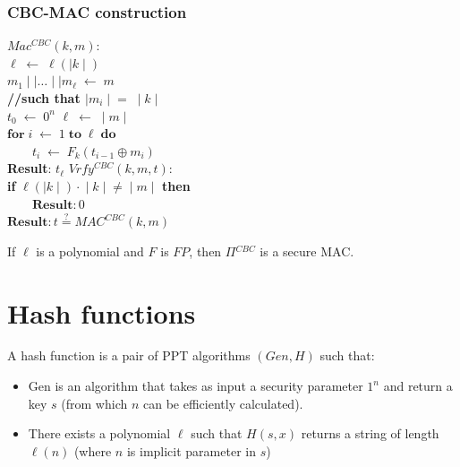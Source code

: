 \documentclass[../main]{subfiles}
\begin{document}
\subsubsection{CBC-MAC construction}
$Mac^{CBC}(k, m)$:\\
$\ell{} \; \leftarrow{} \; \ell{}(\mid{} k \mid)$\\
$m_1 \mid\mid{} \ldots{} \mid\mid{} m_{\ell} \; \leftarrow{} \; m$\\
\textbf{//such that $\mid{} m_i \mid{} = \; \mid{}k\mid{}$}\\
$t_0 \; \leftarrow{} \; 0^n$
$\ell{} \; \leftarrow{} \; \mid{} m \mid{}$\\
$\textbf{for} \; i \; \leftarrow{} \; 1 \; \textbf{to} \; \ell{} \; \textbf{do}$\\
$\quad{}\quad{} t_i \; \leftarrow{} \; F_k(t_{i-1} \oplus{} m_i)$\\
\textbf{Result}: $t_{\ell}$
\newline
\newline
$Vrfy^{CBC}(k, m, t)$:\\
\textbf{if} $\ell{}(\mid k \mid) \cdot{} \mid{} k \mid{} \neq{} \mid{} m \mid{}$ \textbf{then}\\
$\quad{}\quad{} \textbf{Result}: 0$\\
$\textbf{Result}: t \stackrel{?}{=} MAC^{CBC}(k, m)$\\

\begin{theorem}
    If $\ell{}$ is a polynomial and $F$ is $FP$, then $\Pi{}^{CBC}$ is a secure MAC.
\end{theorem}
\section{Hash functions}
\begin{definition}
    A hash function is a pair of PPT algorithms $(Gen, H)$ such that:
    \begin{itemize}
        \item Gen is an algorithm that takes as input a security parameter $1^n$ and return a key $s$ (from which $n$ can be efficiently calculated).
        \item There exists a polynomial $\ell{}$ such that $H(s, x)$ returns a string of length $\ell{}(n)$ (where $n$ is implicit parameter in $s$)
    \end{itemize}
\end{definition}
\end{document}

